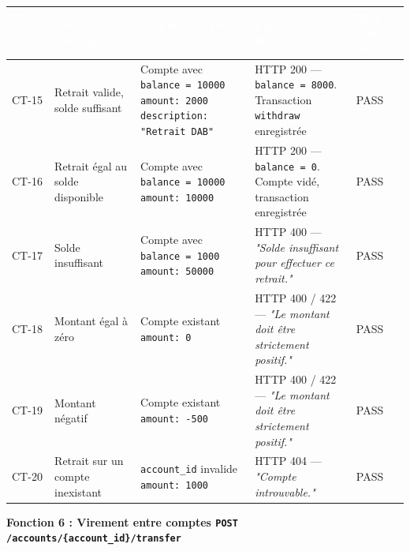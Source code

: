 \documentclass[12pt,a4paper,landscape]{article}
\begin{document}
\begin{longtable}{|L{2cm}|L{5cm}|L{6.5cm}|L{5cm}|L{2.5cm}|}
\hline
{}
\textbf{\textcolor{white}{Test Case ID}} &
\textbf{\textcolor{white}{Test Case Description}} &
\textbf{\textcolor{white}{Test Input (Test Case Value)}} &
\textbf{\textcolor{white}{Expected Results}} &
\textbf{\textcolor{white}{Test Case Status}} \\
\hline
CT-15 &
Retrait valide, solde suffisant &
Compte avec \texttt{balance = 10000} \newline \texttt{amount: 2000} \newline \texttt{description: "Retrait DAB"} &
HTTP 200 — \texttt{balance = 8000}. Transaction \texttt{withdraw} enregistrée &
PASS \\
\hline
{}
CT-16 &
Retrait égal au solde disponible &
Compte avec \texttt{balance = 10000} \newline \texttt{amount: 10000} &
HTTP 200 — \texttt{balance = 0}. Compte vidé, transaction enregistrée &
PASS \\
\hline
CT-17 &
Solde insuffisant &
Compte avec \texttt{balance = 1000} \newline \texttt{amount: 50000} &
HTTP 400 — \textit{"Solde insuffisant pour effectuer ce retrait."} &
PASS \\
\hline
{}
CT-18 &
Montant égal à zéro &
Compte existant \newline \texttt{amount: 0} &
HTTP 400 / 422 — \textit{"Le montant doit être strictement positif."} &
PASS \\
\hline
CT-19 &
Montant négatif &
Compte existant \newline \texttt{amount: -500} &
HTTP 400 / 422 — \textit{"Le montant doit être strictement positif."} &
PASS \\
\hline
{}
CT-20 &
Retrait sur un compte inexistant &
\texttt{account\_id} invalide \newline \texttt{amount: 1000} &
HTTP 404 — \textit{"Compte introuvable."} &
PASS \\
\hline
\end{longtable}

\vspace{0.3cm}
{\bfseries\large\textcolor{rowtitle}{Fonction 6 : Virement entre comptes \quad \texttt{POST /accounts/\{account\_id\}/transfer}}}
\vspace{0.2cm}
\end{document}
